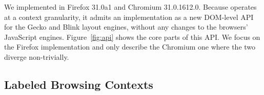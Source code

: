 We implemented \sys{} in Firefox 31.0a1 and Chromium 31.0.1612.0.
%
Because \sys{} operates at a context granularity, it admits an
implementation as a new DOM-level API for the Gecko and Blink layout
engines, without any changes to the browsers' JavaScript engines.
%
Figure~\ref{fig:api} shows the core parts of this API.
%
%
We focus on the Firefox implementation and only describe the Chromium
one where the two diverge non-trivially.
%

\subsection{Labeled Browsing Contexts}
\begin{table}
\caption{Confining code from exfiltrating data using existing browser
mechanisms.}
\label{tab:comm}
\end{table}
 

